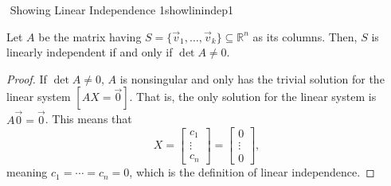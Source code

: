         \begin{theorem}{\Stop\,\,Showing Linear Independence 1}{showlinindep1}

           Let \(A\) be the matrix having \(S=\{\vec{v}_1,\ldots,\vec{v}_k\}\subseteq \mathbb{R}^n\) as its columns. Then, \(S\) is linearly independent if and only if \(\det A\neq0\).
           \begin{proof}
                If \(\det A\neq0\), \(A\) is nonsingular and only has the trivial solution for the linear system \([AX=\vec{0}]\). That is, the only solution for the linear system is \(A\vec{0}=\vec{0}\). This means that
                \begin{equation*}
                    X
                    =
                    \begin{bmatrix}
                        c_1 \\ \vdots \\ c_n 
                    \end{bmatrix} 
                    =
                    \begin{bmatrix}
                        0\\ \vdots \\ 0
                    \end{bmatrix},
                \end{equation*}
                meaning \(c_1=\cdots=c_n=0\), which is the definition of linear independence.
           \end{proof}
            
        \end{theorem}
        \pagebreak
